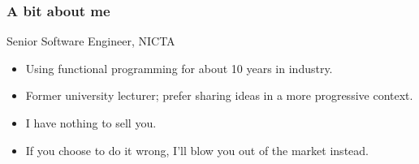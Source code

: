 \begin{frame}
\frametitle{A bit about me}
\begin{block}{Senior Software Engineer, NICTA}
\begin{itemize}
\item<1-> Using functional programming for about 10 years in industry.
\item<2-> Former university lecturer; prefer sharing ideas in a more progressive context.
\item<3-> I have nothing to sell you.
\item<4-> If you choose to do it wrong, I'll blow you out of the market instead.
\end{itemize}
\end{block}
\end{frame}
